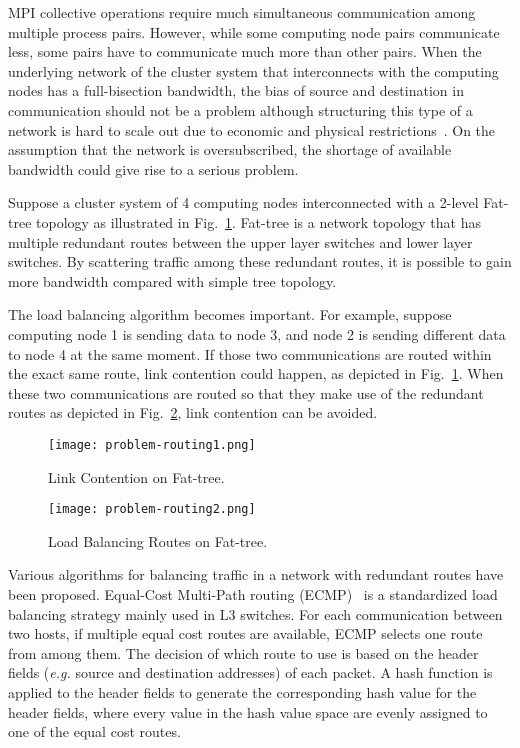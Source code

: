 MPI collective operations require much simultaneous communication among
multiple process pairs. However, while some computing node pairs
communicate less, some pairs have to communicate much more than other
pairs. When the underlying network of the cluster system that
interconnects with the computing nodes has a full-bisection bandwidth,
the bias of source and destination in communication should not be a
problem although structuring this type of a network is hard to scale out
due to economic and physical restrictions~\cite{Al-Fares2008}. On the
assumption that the network is oversubscribed, the shortage of available
bandwidth could give rise to a serious problem.

Suppose a cluster system of 4 computing nodes interconnected with a
2-level Fat-tree topology as illustrated in Fig.~\ref{fig-problem-routing1}.
Fat-tree is a network topology that has multiple redundant routes between the
upper layer switches and lower layer switches. By scattering traffic among
these redundant routes, it is possible to gain more bandwidth compared with
simple tree topology.

The load balancing algorithm becomes important. For example, suppose
computing node 1 is sending data to node 3, and node 2 is sending
different data to node 4 at the same moment. If those two communications
are routed within the exact same route, link contention could happen, as
depicted in Fig.~\ref{fig-problem-routing1}. When these two
communications are routed so that they make use of the redundant routes
as depicted in Fig.~\ref{fig-problem-routing2}, link contention can be
avoided.

\begin{figure}[htbp]
    \centering
    \texttt{[image: problem-routing1.png]}
    \caption{Link Contention on Fat-tree.}%
    \label{fig-problem-routing1}
\end{figure}

\begin{figure}[htbp]
    \centering
    \texttt{[image: problem-routing2.png]}
    \caption{Load Balancing Routes on Fat-tree.}%
    \label{fig-problem-routing2}
\end{figure}

Various algorithms for balancing traffic in a network with redundant
routes have been proposed. Equal-Cost Multi-Path routing (ECMP)~\cite{ecmp} is
a standardized load balancing strategy mainly used in L3 switches. For each
communication between two hosts, if multiple equal cost routes are available,
ECMP selects one route from among them. The decision of which route to use is
based on the header fields (\emph{e.g.} source and destination addresses) of
each packet. A hash function is applied to the header fields to generate the
corresponding hash value for the header fields, where every value in the hash
value space are evenly assigned to one of the equal cost routes.

